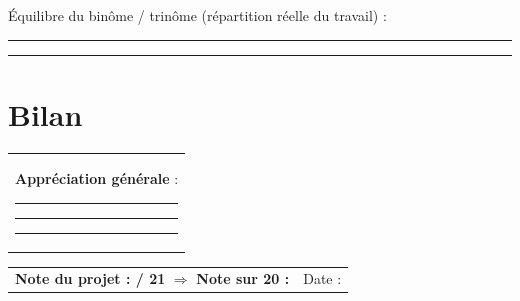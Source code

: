\documentclass[10pt,a4paper]{article}
\begin{document}
\medskip
Équilibre du binôme / trinôme (répartition réelle du travail) :
\par\medskip\hrule\medskip\hrule\medskip

\section*{Bilan}
\begin{tabularx}{\linewidth}{@{}X@{}}
\textbf{Appréciation générale} :\par\medskip
\hrule\medskip\hrule\medskip\hrule\medskip
\end{tabularx}

\bigskip
\begin{tabularx}{\linewidth}{@{}X r@{}}
\textbf{Note du projet : \hspace{1.5cm} / 21} \quad $\Rightarrow$ \quad \textbf{Note sur 20 : \hspace{1.5cm}} & Date : \dotfill \\
\end{tabularx}
\end{document}
